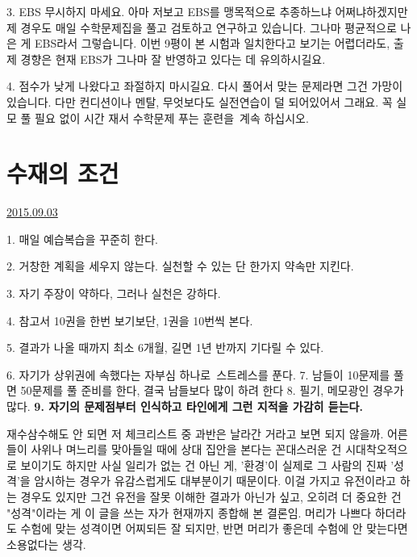 \item 3. EBS 무시하지 마세요. 아마 저보고 EBS를 맹목적으로 추종하느냐 어쩌냐하겠지만
제 경우도 매일 수학문제집을 풀고 검토하고 연구하고 있습니다. 그나마 평균적으로 나은 게 EBS라서 그렇습니다.
이번 9평이 본 시험과 일치한다고 보기는 어렵더라도, 출제 경향은 현재 EBS가 그나마 잘 반영하고 있다는 데 유의하시길요.
\vspace{5mm}

\item 4. 점수가 낮게 나왔다고 좌절하지 마시길요.
다시 풀어서 맞는 문제라면 그건 가망이 있습니다. 다만 컨디션이나 멘탈, 무엇보다도 실전연습이 덜 되어있어서 그래요.
꼭 실모 풀 필요 없이 시간 재서 수학문제 푸는 훈련을 계속 하십시오.
\vspace{5mm}





\section{수재의 조건}
\href{https://www.kockoc.com/Apoc/287758}{2015.09.03}

\vspace{5mm}

\item 1. 매일 예습복습을 꾸준히 한다.
\item 2. 거창한 계획을 세우지 않는다. 실천할 수 있는 단 한가지 약속만 지킨다.
\item 3. 자기 주장이 약하다, 그러나 실천은 강하다.
\item 4. 참고서 10권을 한번 보기보단, 1권을 10번씩 본다.
\item 5. 결과가 나올 때까지 최소 6개월, 길면 1년 반까지 기다릴 수 있다.
\item 6. 자기가 상위권에 속했다는 자부심 하나로 스트레스를 푼다.
7. 남들이 10문제를 풀면 50문제를 풀 준비를 한다, 결국 남들보다 많이 하려 한다
8. 필기, 메모광인 경우가 많다.
\textbf{9. 자기의 문제점부터 인식하고 타인에게 그런 지적을 가감히 듣는다.}
\vspace{5mm}

재수삼수해도 안 되면 저 체크리스트 중 과반은 날라간 거라고 보면 되지 않을까.
어른들이 사위나 며느리를 맞아들일 때에 상대 집안을 본다는 꼰대스러운 건 시대착오적으로 보이기도 하지만
사실 일리가 없는 건 아닌 게, '환경'이 실제로 그 사람의 진짜 '성격'을 암시하는 경우가 유감스럽게도 대부분이기 때문이다.
이걸 가지고 유전이라고 하는 경우도 있지만 그건 유전을 잘못 이해한 결과가 아닌가 싶고,
오히려 더 중요한 건 "성격"이라는 게 이 글을 쓰는 자가 현재까지 종합해 본 결론임.
머리가 나쁘다 하더라도 수험에 맞는 성격이면 어찌되든 잘 되지만, 반면 머리가 좋은데 수험에 안 맞는다면 소용없다는 생각.
\vspace{5mm}

